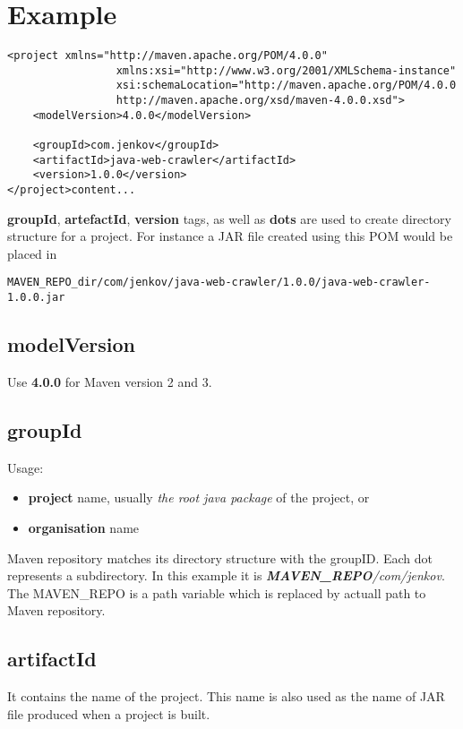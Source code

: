 \documentclass{report}
\begin{document}
\section{Example}
\begin{verbatim}
<project xmlns="http://maven.apache.org/POM/4.0.0"
                 xmlns:xsi="http://www.w3.org/2001/XMLSchema-instance"
                 xsi:schemaLocation="http://maven.apache.org/POM/4.0.0
                 http://maven.apache.org/xsd/maven-4.0.0.xsd">
    <modelVersion>4.0.0</modelVersion>

    <groupId>com.jenkov</groupId>
    <artifactId>java-web-crawler</artifactId>
    <version>1.0.0</version>
</project>content...
\end{verbatim}

\textbf{groupId}, \textbf{artefactId}, \textbf{version} tags, as well as \textbf{dots} are used to create directory structure for a project. For instance a JAR
file created using this POM would be placed in
\begin{verbatim}
MAVEN_REPO_dir/com/jenkov/java-web-crawler/1.0.0/java-web-crawler-1.0.0.jar
\end{verbatim}

\subsection{modelVersion}
Use \textbf{4.0.0} for Maven version 2 and 3.

\subsection{groupId}
Usage:
\begin{itemize}
	\item \textbf{project} name, usually \textit{the root java package} of the project, or
	\item \textbf{organisation} name
\end{itemize}
Maven repository matches its directory structure with the groupID. Each dot represents a subdirectory. In this example it is \textit{\textbf{MAVEN\_REPO}/com/jenkov}.
The MAVEN\_REPO is a path variable which is replaced by actuall path to Maven repository.

\subsection{artifactId}
It contains the name of the project. This name is also used as the name of JAR file produced when a project is built.
\end{document}
